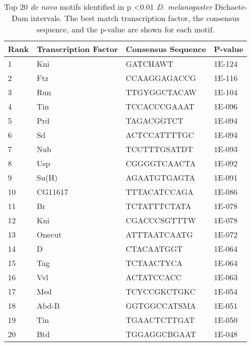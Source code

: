 \begin{table}[h]
\centering
\begin{tabular}{|l|l|l|l|}
\hline
\textbf{Rank} & \textbf{Transcription Factor} & \textbf{Consensus Sequence} & \textbf{P-value} \\ \hline
1    & Kni                  & GATCHAWT           & 1E-124  \\ \hline
2    & Ftz                  & CCAAGGAGACCG       & 1E-116  \\ \hline
3    & Run                  & TTGYGGCTACAW       & 1E-104  \\ \hline
4    & Tin                  & TCCACCCGAAAT       & 1E-096  \\ \hline
5    & Prd                  & TAGACGGTCT         & 1E-094  \\ \hline
6    & Sd                   & ACTCCATTTTGC       & 1E-094  \\ \hline
7    & Nub                  & TCCTTTGSATDT       & 1E-093  \\ \hline
8    & Usp                  & CGGGGTCAACTA       & 1E-092  \\ \hline
9    & Su(H)                & AGAATGTGAGTA       & 1E-091  \\ \hline
10   & CG11617              & TTTACATCCAGA       & 1E-086  \\ \hline
11   & Br                   & TCTATTTCTATA       & 1E-078  \\ \hline
12   & Kni                  & CGACCCSGTTTW       & 1E-078  \\ \hline
13   & Onecut               & ATTTAATCAATG       & 1E-072  \\ \hline
14   & D                    & CTACAATGGT         & 1E-064  \\ \hline
15   & Tag                  & TCTAACTYCA         & 1E-064  \\ \hline
16   & Vvl                  & ACTATCCACC         & 1E-063  \\ \hline
17   & Med                  & TCYCCGKCTGKC       & 1E-054  \\ \hline
18   & Abd-B                & GGTGGCCATSMA       & 1E-051  \\ \hline
19   & Tin                  & TGAACTCTTGAT       & 1E-050  \\ \hline
20   & Btd                  & TGGAGGCBGAAT       & 1E-048  \\ \hline
\end{tabular}
\caption{Top 20 \emph{de novo} motifs identified in p \textless 0.01 \emph{D. melanogaster} Dichaete-Dam intervals. The best match transcription factor, the consensus sequence, and the p-value are shown for each motif.}
\label{Table 4.6}
\end{table}

